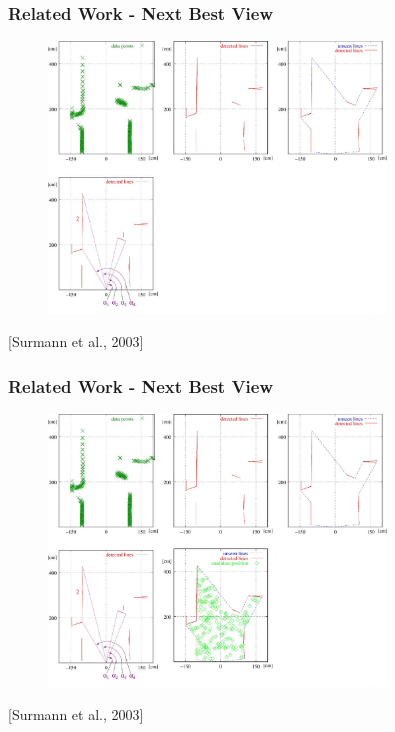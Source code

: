 \documentclass[t]{beamer} %
\begin{document}
\begin{frame}
	\frametitle{ Related Work - Next Best View}
	\begin{figure}[h]
		\includegraphics[width=0.8\textwidth]{src/nbv4.png}
	\end{figure}
	\centering
	\scriptsize [Surmann et al., 2003]
\end{frame}

\begin{frame}
	\frametitle{ Related Work - Next Best View}
	\begin{figure}[h]
		\includegraphics[width=0.8\textwidth]{src/nbv5.png}
	\end{figure}
	\centering
	\scriptsize [Surmann et al., 2003]
\end{frame}
\end{document}
